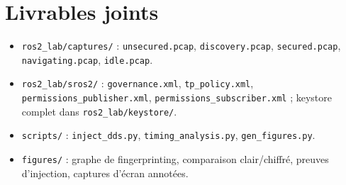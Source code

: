 \documentclass[11pt,a4paper]{article}
\newcommand{\cmd}[1]{\texttt{\small #1}}
\begin{document}
\appendix
\section{Livrables joints}
\begin{itemize}[nosep]
  \item \cmd{ros2\_lab/captures/} : \cmd{unsecured.pcap}, \cmd{discovery.pcap},
        \cmd{secured.pcap}, \cmd{navigating.pcap}, \cmd{idle.pcap}.
  \item \cmd{ros2\_lab/sros2/} : \cmd{governance.xml}, \cmd{tp\_policy.xml},
        \cmd{permissions\_publisher.xml}, \cmd{permissions\_subscriber.xml} ;
        keystore complet dans \cmd{ros2\_lab/keystore/}.
  \item \cmd{scripts/} : \cmd{inject\_dds.py}, \cmd{timing\_analysis.py},
        \cmd{gen\_figures.py}.
  \item \cmd{figures/} : graphe de fingerprinting, comparaison clair/chiffré,
        preuves d'injection, captures d'écran annotées.
\end{itemize}
\end{document}
